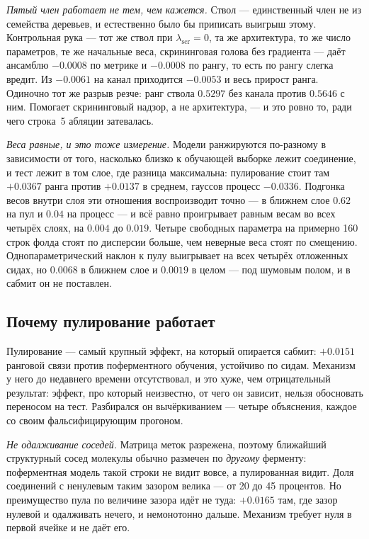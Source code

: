 \emph{Пятый член работает не тем, чем кажется.} Ствол --- единственный член не из семейства
деревьев, и естественно было бы приписать выигрыш этому. Контрольная рука --- тот же ствол при
$\lambda_{\text{scr}} = 0$, та же архитектура, то же число параметров, те же начальные веса,
скрининговая голова без градиента --- даёт ансамблю $-0.0008$ по метрике и $-0.0008$ по рангу,
то есть по рангу слегка вредит. Из $-0.0061$ на канал приходится $-0.0053$ и весь прирост
ранга. Одиночно тот же разрыв резче: ранг ствола $0.5297$ без канала против $0.5646$ с ним.
Помогает скрининговый надзор, а не архитектура, --- и это ровно то, ради чего строка~5 абляции
затевалась.

\emph{Веса равные, и это тоже измерение.} Модели ранжируются по-разному в зависимости от того,
насколько близко к обучающей выборке лежит соединение, и тест лежит в том слое, где разница
максимальна: пулирование стоит там $+0.0367$ ранга против $+0.0137$ в среднем, гауссов процесс
$-0.0336$. Подгонка весов внутри слоя эти отношения воспроизводит точно --- в ближнем слое
$0.62$ на пул и $0.04$ на процесс --- и всё равно проигрывает равным весам во всех четырёх
слоях, на $0.004$ до $0.019$. Четыре свободных параметра на примерно 160 строк фолда стоят по
дисперсии больше, чем неверные веса стоят по смещению. Однопараметрический наклон к пулу
выигрывает на всех четырёх отложенных сидах, но $0.0068$ в ближнем слое и $0.0019$ в целом ---
под шумовым полом, и в сабмит он не поставлен.


\subsection{Почему пулирование работает}
\label{sec:poolwhy}

Пулирование --- самый крупный эффект, на который опирается сабмит: $+0.0151$ ранговой связи
против поферментного обучения, устойчиво по сидам. Механизм у него до недавнего времени
отсутствовал, и это хуже, чем отрицательный результат: эффект, про который неизвестно, от чего
он зависит, нельзя обосновать переносом на тест. Разбирался он вычёркиванием --- четыре
объяснения, каждое со своим фальсифицирующим прогоном.

\emph{Не одалживание соседей.} Матрица меток разрежена, поэтому ближайший структурный сосед
молекулы обычно размечен по \emph{другому} ферменту: поферментная модель такой строки не видит
вовсе, а пулированная видит. Доля соединений с ненулевым таким зазором велика --- от 20 до 45
процентов. Но преимущество пула по величине зазора идёт не туда: $+0.0165$ там, где зазор
нулевой и одалживать нечего, и немонотонно дальше. Механизм требует нуля в первой ячейке и не
даёт его.

